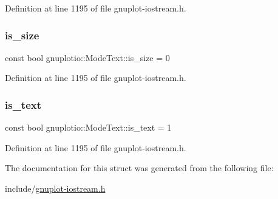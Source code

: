 Definition at line 1195 of file gnuplot-\/iostream.\+h.

\mbox{\label{structgnuplotio_1_1_mode_text_aaffc1e7bb26c6d1404cb5a3f03f13be9}} 
\subsubsection{\texorpdfstring{is\+\_\+size}{is\_size}}
{\footnotesize\ttfamily const bool gnuplotio\+::\+Mode\+Text\+::is\+\_\+size = 0\hspace{0.3cm}{\ttfamily [static]}}



Definition at line 1195 of file gnuplot-\/iostream.\+h.

\mbox{\label{structgnuplotio_1_1_mode_text_a7083d8977c354a036a7c542bf99d3d52}} 
\subsubsection{\texorpdfstring{is\+\_\+text}{is\_text}}
{\footnotesize\ttfamily const bool gnuplotio\+::\+Mode\+Text\+::is\+\_\+text = 1\hspace{0.3cm}{\ttfamily [static]}}



Definition at line 1195 of file gnuplot-\/iostream.\+h.



The documentation for this struct was generated from the following file\+:\begin{DoxyCompactItemize}
\item 
include/\hyperlink{gnuplot-iostream_8h}{gnuplot-\/iostream.\+h}\end{DoxyCompactItemize}

